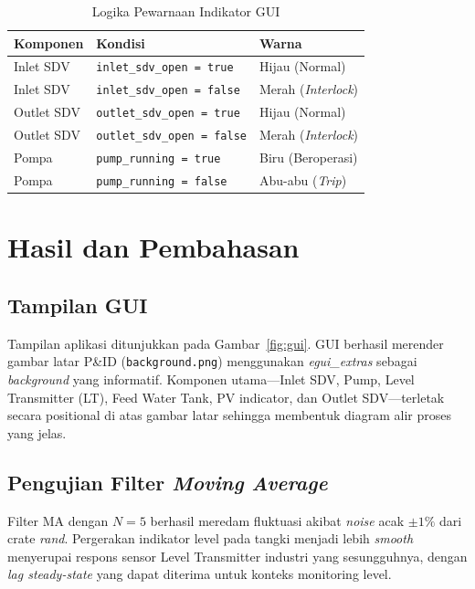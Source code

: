 \documentclass[12pt,a4paper]{article}
\begin{document}
\begin{table}[H]
\centering
\caption{Logika Pewarnaan Indikator GUI}
\label{tab:warna}
\begin{tabular}{l l l}
\toprule
\textbf{Komponen}  & \textbf{Kondisi}                      & \textbf{Warna} \\
\midrule
Inlet SDV  & \texttt{inlet\_sdv\_open = true}    & Hijau (Normal) \\
Inlet SDV  & \texttt{inlet\_sdv\_open = false}   & Merah (\textit{Interlock}) \\
Outlet SDV & \texttt{outlet\_sdv\_open = true}   & Hijau (Normal) \\
Outlet SDV & \texttt{outlet\_sdv\_open = false}  & Merah (\textit{Interlock}) \\
Pompa      & \texttt{pump\_running = true}       & Biru (Beroperasi) \\
Pompa      & \texttt{pump\_running = false}      & Abu-abu (\textit{Trip}) \\
\bottomrule
\end{tabular}
\end{table}

\section{Hasil dan Pembahasan}

\subsection{Tampilan GUI}
Tampilan aplikasi ditunjukkan pada Gambar~\ref{fig:gui}. GUI berhasil
merender gambar latar P\&ID (\texttt{background.png}) menggunakan
\textit{egui\_extras} sebagai \textit{background} yang informatif.
Komponen utama---Inlet SDV, Pump, Level Transmitter (LT), Feed Water Tank,
PV indicator, dan Outlet SDV---terletak secara positional di atas gambar
latar sehingga membentuk diagram alir proses yang jelas.

\subsection{Pengujian Filter \textit{Moving Average}}
Filter MA dengan $N=5$ berhasil meredam fluktuasi akibat \textit{noise}
acak $\pm 1\%$ dari crate \textit{rand}. Pergerakan indikator level pada
tangki menjadi lebih \textit{smooth} menyerupai respons sensor Level
Transmitter industri yang sesungguhnya, dengan \textit{lag steady-state}
yang dapat diterima untuk konteks monitoring level.
\end{document}
